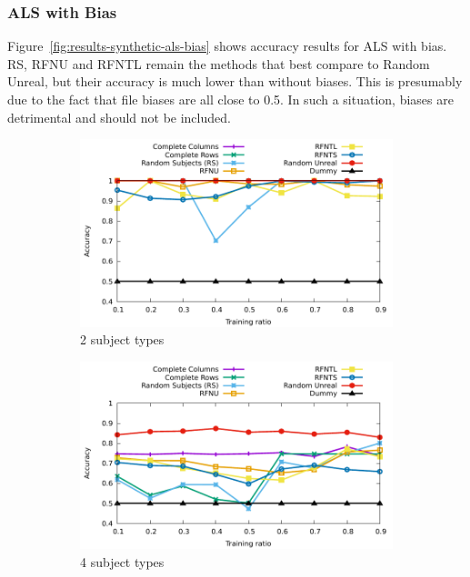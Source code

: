 \documentclass[10pt, conference, compsocconf]{IEEEtran}
\begin{document}
\subsubsection{ALS with Bias}

Figure~\ref{fig:results-synthetic-als-bias} shows accuracy results for 
ALS with bias. RS, RFNU and RFNTL remain the methods that best compare 
to Random Unreal, but their accuracy is much lower than without 
biases. This is presumably due to 
the fact that file biases are all close to 0.5. 
In such a situation, biases are detrimental and should not be included.

\begin{figure}
\begin{subfigure}[b]{\columnwidth}
        \includegraphics[width=0.8\columnwidth]{data/results/means_of_results/ALS-Bias/Synthetic/synthetic_subject_types/ALS-Bias-2-types.pdf}
        \caption{2 subject types}
\end{subfigure}
\begin{subfigure}[b]{\columnwidth}
        \includegraphics[width=0.8\columnwidth]{data/results/means_of_results/ALS-Bias/Synthetic/synthetic_subject_types/ALS-Bias-4-types.pdf}
        \caption{4 subject types}
\end{subfigure}
\begin{subfigure}[b]{\columnwidth}

\end{subfigure}
\end{figure}
\end{document}
